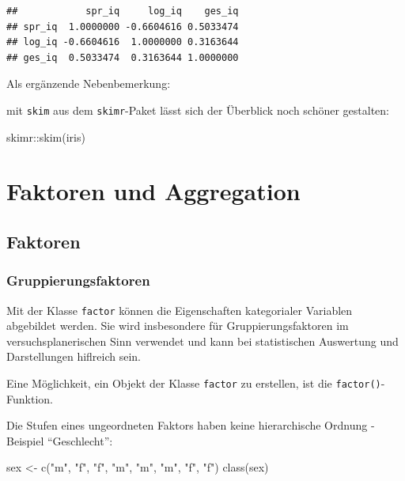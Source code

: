 \documentclass[
]{book}
\newenvironment{Shaded}{\begin{snugshade}}{\end{snugshade}}
\newcommand{\FunctionTok}[1]{\textcolor[rgb]{0.00,0.00,0.00}{#1}}
\newcommand{\NormalTok}[1]{#1}
\newcommand{\OtherTok}[1]{\textcolor[rgb]{0.56,0.35,0.01}{#1}}
\newcommand{\SpecialCharTok}[1]{\textcolor[rgb]{0.00,0.00,0.00}{#1}}
\newcommand{\StringTok}[1]{\textcolor[rgb]{0.31,0.60,0.02}{#1}}
\begin{document}
\begin{verbatim}
##            spr_iq     log_iq    ges_iq
## spr_iq  1.0000000 -0.6604616 0.5033474
## log_iq -0.6604616  1.0000000 0.3163644
## ges_iq  0.5033474  0.3163644 1.0000000
\end{verbatim}

Als ergänzende Nebenbemerkung:

mit \texttt{skim} aus dem \texttt{skimr}-Paket lässt sich der Überblick noch schöner gestalten:

\begin{Shaded}
\begin{Highlighting}[]
\NormalTok{skimr}\SpecialCharTok{::}\FunctionTok{skim}\NormalTok{(iris)}
\end{Highlighting}
\end{Shaded}

\hypertarget{faktoren-und-aggregation}{%
\chapter{Faktoren und Aggregation}\label{faktoren-und-aggregation}}

\hypertarget{faktoren}{%
\section{Faktoren}\label{faktoren}}

\hypertarget{gruppierungsfaktoren}{%
\subsection{Gruppierungsfaktoren}\label{gruppierungsfaktoren}}

Mit der Klasse \texttt{factor} können die Eigenschaften kategorialer Variablen abgebildet werden. Sie wird insbesondere für Gruppierungsfaktoren im versuchsplanerischen Sinn verwendet und kann bei statistischen Auswertung und Darstellungen hiflreich sein.

Eine Möglichkeit, ein Objekt der Klasse \texttt{factor} zu erstellen, ist die \texttt{factor()}-Funktion.

Die Stufen eines ungeordneten Faktors haben keine hierarchische Ordnung - Beispiel ``Geschlecht'':

\begin{Shaded}
\begin{Highlighting}[]
\NormalTok{sex }\OtherTok{\textless{}{-}} \FunctionTok{c}\NormalTok{(}\StringTok{"m"}\NormalTok{, }\StringTok{"f"}\NormalTok{, }\StringTok{"f"}\NormalTok{, }\StringTok{"m"}\NormalTok{, }\StringTok{"m"}\NormalTok{, }\StringTok{"m"}\NormalTok{, }\StringTok{"f"}\NormalTok{, }\StringTok{"f"}\NormalTok{)}
\FunctionTok{class}\NormalTok{(sex)}
\end{Highlighting}
\end{Shaded}
\end{document}
